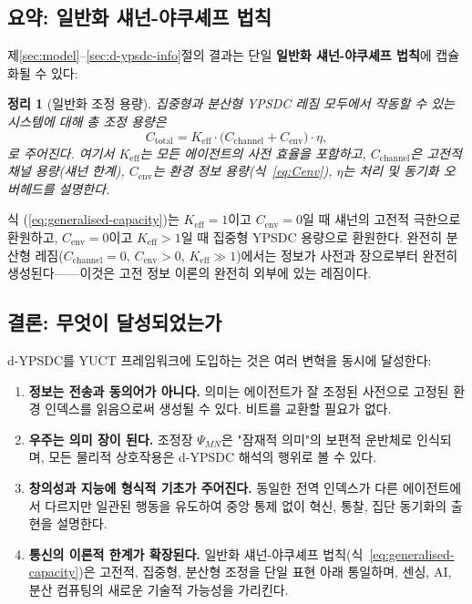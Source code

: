 \documentclass[12pt,a4paper]{article}
\newtheorem{theorem}{정리}[section]
\begin{document}
	\subsection{요약: 일반화 섀넌-야쿠셰프 법칙}
	\label{subsec:generalised-law}
	
	제\ref{sec:model}--\ref{sec:d-ypsdc-info}절의 결과는 단일 \textbf{일반화 섀넌-야쿠셰프 법칙}에 캡슐화될 수 있다:
	
	\begin{theorem}[일반화 조정 용량]
		집중형과 분산형 YPSDC 레짐 모두에서 작동할 수 있는 시스템에 대해 총 조정 용량은
		\begin{equation}
			\boxed{C_{\mathrm{total}} = K_{\mathrm{eff}} \cdot \bigl( C_{\mathrm{channel}} + C_{\mathrm{env}} \bigr) \cdot \eta},
			\label{eq:generalised-capacity}
		\end{equation}
		로 주어진다. 여기서 $K_{\mathrm{eff}}$는 모든 에이전트의 사전 효율을 포함하고, $C_{\mathrm{channel}}$은 고전적 채널 용량(섀넌 한계), $C_{\mathrm{env}}$는 환경 정보 용량(식~\eqref{eq:Cenv}), $\eta$는 처리 및 동기화 오버헤드를 설명한다.
	\end{theorem}
	
	식 (\ref{eq:generalised-capacity})는 $K_{\mathrm{eff}}=1$이고 $C_{\mathrm{env}}=0$일 때 섀넌의 고전적 극한으로 환원하고, $C_{\mathrm{env}}=0$이고 $K_{\mathrm{eff}}>1$일 때 집중형 YPSDC 용량으로 환원한다. 완전히 분산형 레짐($C_{\mathrm{channel}}=0$, $C_{\mathrm{env}}>0$, $K_{\mathrm{eff}}\gg1$)에서는 정보가 사전과 장으로부터 완전히 생성된다——이것은 고전 정보 이론의 완전히 외부에 있는 레짐이다.
	
	\subsection{결론: 무엇이 달성되었는가}
	\label{subsec:conclusions-dypsdc}
	
	d-YPSDC를 YUCT 프레임워크에 도입하는 것은 여러 변혁을 동시에 달성한다:
	
	\begin{enumerate}[leftmargin=*]
		\item \textbf{정보는 전송과 동의어가 아니다.}
		의미는 에이전트가 잘 조정된 사전으로 고정된 환경 인덱스를 읽음으로써 생성될 수 있다. 비트를 교환할 필요가 없다.
		\item \textbf{우주는 의미 장이 된다.}
		조정장 $\Psi_{MN}$은 "잠재적 의미"의 보편적 운반체로 인식되며, 모든 물리적 상호작용은 d-YPSDC 해석의 행위로 볼 수 있다.
		\item \textbf{창의성과 지능에 형식적 기초가 주어진다.}
		동일한 전역 인덱스가 다른 에이전트에서 다르지만 일관된 행동을 유도하여 중앙 통제 없이 혁신, 통찰, 집단 동기화의 출현을 설명한다.
		\item \textbf{통신의 이론적 한계가 확장된다.}
		일반화 섀넌-야쿠셰프 법칙(식~\ref{eq:generalised-capacity})은 고전적, 집중형, 분산형 조정을 단일 표현 아래 통일하며, 센싱, AI, 분산 컴퓨팅의 새로운 기술적 가능성을 가리킨다.
	\end{enumerate}
	
\end{document}
